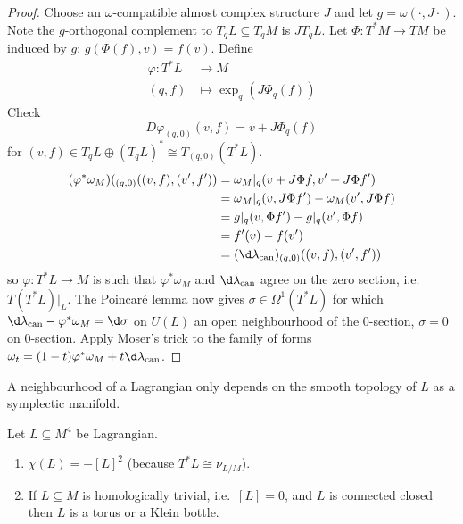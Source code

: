 \documentclass[a4paper]{article}
\begin{document}
\begin{proof}
  Choose an \(\omega\)-compatible almost complex structure \(J\) and let \(g = \omega(\cdot, J \cdot)\). Note the \(g\)-orthogonal complement to \(T_qL \subseteq T_qM\) is \(JT_qL\). Let \(\Phi: T^*M \to TM\) be induced by \(g\): \(g(\Phi(f), v) = f(v)\). Define
  \begin{align*}
    \varphi: T^*L &\to M \\
    (q, f) &\mapsto \exp_q(J \Phi_q(f))
  \end{align*}
  Check
  \[
    D \varphi_{(q, 0)}(v, f) = v + J \Phi_q(f)
  \]
  for \((v, f) \in T_qL \oplus (T_qL)^* \cong T_{(q, 0)}(T^*L)\).
  \begin{align*}
    (\varphi^* \omega_M)(_{(q, 0)}((v, f), (v', f'))
    &= \omega_M|_q(v + J\Phi f, v' + J\Phi f') \\
    &= \omega_M|_q(v, J \Phi f') - \omega_M(v', J\Phi f) \\
    &= g|_q(v, \Phi f') - g|_q(v', \Phi f) \\
    &= f'(v) - f(v') \\
    &= (\d \lambda_{\mathrm{can}})_{(q, 0)} ((v, f), (v', f'))
  \end{align*}
  so \(\varphi: T^*L \to M\) is such that \(\varphi^* \omega_M\) and \(\d \lambda_{\mathrm{can}}\) agree on the zero section, i.e.\ \(T(T^*L)|_L\). The Poincaré lemma now gives \(\sigma \in \Omega^1(T^*L)\) for which \(\d \lambda_{\mathrm{can}} - \varphi^* \omega_M = \d \sigma\) on \(U(L)\) an open neighbourhood of the \(0\)-section, \(\sigma = 0\) on \(0\)-section. Apply Moser's trick to the family of forms \(\omega_t = (1 - t) \varphi^* \omega_M + t \d \lambda_{\mathrm{can}}\).
\end{proof}

\begin{corollary}
  A neighbourhood of a Lagrangian only depends on the smooth topology of \(L\) as a symplectic manifold.
\end{corollary}

\begin{ex}
  Let \(L \subseteq M^4\) be Lagrangian.
  \begin{enumerate}
  \item \(\chi(L) = - [L]^2\) (because \(T^*L \cong \nu_{L/M}\)).
  \item If \(L \subseteq M\) is homologically trivial, i.e.\ \([L] = 0\), and \(L\) is connected closed then \(L\) is a torus or a Klein bottle.
  \end{enumerate}
\end{ex}
\end{document}
